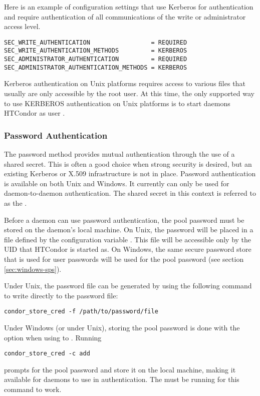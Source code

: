 Here is
an example of configuration settings that use Kerberos for
authentication and require authentication of all communications
of the write or administrator access level.
\footnotesize
\begin{verbatim}
SEC_WRITE_AUTHENTICATION                 = REQUIRED
SEC_WRITE_AUTHENTICATION_METHODS         = KERBEROS
SEC_ADMINISTRATOR_AUTHENTICATION         = REQUIRED
SEC_ADMINISTRATOR_AUTHENTICATION_METHODS = KERBEROS
\end{verbatim}
\normalsize

Kerberos authentication on Unix platforms
requires access to various files that
usually are only accessible by the root user.
At this time,
the only supported way to use KERBEROS authentication on Unix platforms
is to start daemons HTCondor as user .

\subsubsection{\label{sec:Password-Authentication} Password Authentication}

The password method provides mutual authentication through the use of
a shared secret.  This is often a good choice when strong security is
desired,
but an existing Kerberos or X.509 infrastructure is not in place.
Password authentication is available on both Unix and Windows.
It currently can only be used for daemon-to-daemon authentication.
The shared secret in this context is referred to as
the .

Before a daemon can use password authentication, the pool password
must be stored on the daemon's local machine.
On Unix, the password
will be placed in a file defined by the configuration variable
. This file will be accessible only by the
UID that HTCondor is started as.  On Windows, the same secure password
store that is used for user passwords will be used for the pool
password (see section \ref{sec:windows-sps}).

Under Unix, the password file can be generated by using the following
command to write directly to the password file:
\begin{verbatim}
condor_store_cred -f /path/to/password/file
\end{verbatim}

Under Windows (or under Unix), storing the pool password is done
with the  option when using to  .
Running
\begin{verbatim}
condor_store_cred -c add
\end{verbatim}
prompts for the pool password and store it on the local machine,
making it available for daemons to use in authentication. The
 must be running for this command to work.

